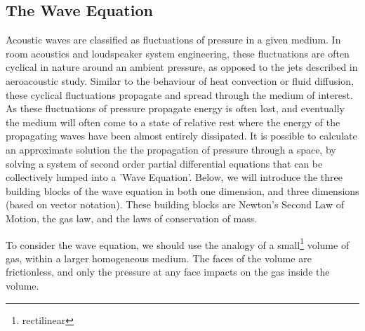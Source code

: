\subsection{The Wave Equation}
Acoustic waves are classified as fluctuations of pressure in a given medium. In room acoustics and loudspeaker system engineering, these fluctuations are often cyclical in nature around an ambient pressure, as opposed to the jets described in aeroacoustic study. Similar to the behaviour of heat convection or fluid diffusion, these cyclical fluctuations propagate and spread through the medium of interest. As these fluctuations of pressure propagate energy is often lost, and eventually the medium will often come to a state of relative rest where the energy of the propagating waves have been almost entirely dissipated. It is possible to calculate an approximate solution the the propagation of pressure through a space, by solving a system of second order partial differential equations that can be collectively lumped into a 'Wave Equation'. Below, we will introduce the three building blocks of the wave equation in both one dimension, and three dimensions (based on vector notation). These building blocks are Newton's Second Law of Motion, the gas law, and the laws of conservation of mass.

To consider the wave equation, we should use the analogy of a small\footnote{rectilinear} volume of gas, within a larger homogeneous medium. The faces of the volume are frictionless, and only the pressure at any face impacts on the gas inside the volume.

